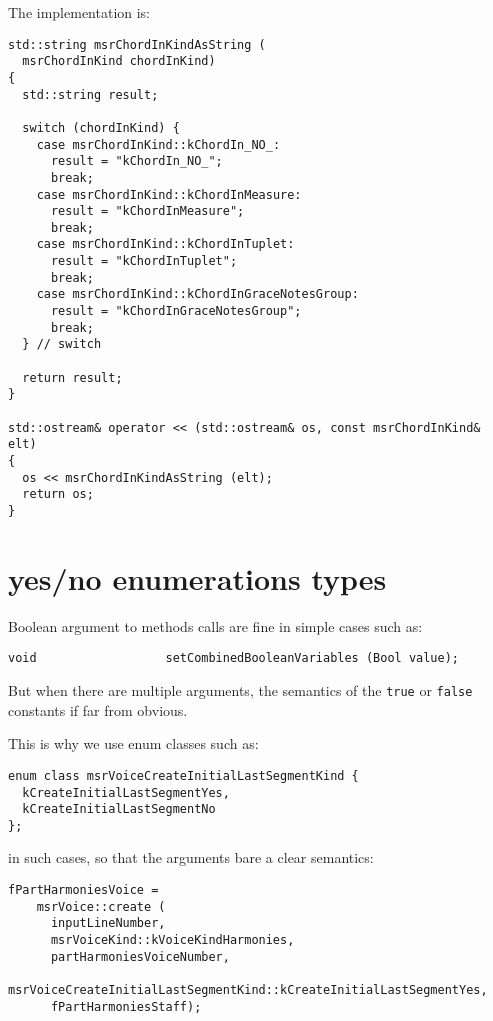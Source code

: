 The implementation is:
\begin{lstlisting}[language=CPlusPlus]
std::string msrChordInKindAsString (
  msrChordInKind chordInKind)
{
  std::string result;

  switch (chordInKind) {
    case msrChordInKind::kChordIn_NO_:
      result = "kChordIn_NO_";
      break;
    case msrChordInKind::kChordInMeasure:
      result = "kChordInMeasure";
      break;
    case msrChordInKind::kChordInTuplet:
      result = "kChordInTuplet";
      break;
    case msrChordInKind::kChordInGraceNotesGroup:
      result = "kChordInGraceNotesGroup";
      break;
  } // switch

  return result;
}

std::ostream& operator << (std::ostream& os, const msrChordInKind& elt)
{
  os << msrChordInKindAsString (elt);
  return os;
}
\end{lstlisting}


\section{yes/no enumerations types}

Boolean argument to methods calls are fine in simple cases such as:
\begin{lstlisting}[language=CPlusPlus]
    void                  setCombinedBooleanVariables (Bool value);
\end{lstlisting}

But when there are multiple arguments, the semantics of the {\tt true} or {\tt false} constants if far from obvious.

This is why we use enum classes such as:
\begin{lstlisting}[language=CPlusPlus]
enum class msrVoiceCreateInitialLastSegmentKind {
  kCreateInitialLastSegmentYes,
  kCreateInitialLastSegmentNo
};
\end{lstlisting}

in such cases, so that the arguments bare a clear semantics:
\begin{lstlisting}[language=CPlusPlus]
  fPartHarmoniesVoice =
    msrVoice::create (
      inputLineNumber,
      msrVoiceKind::kVoiceKindHarmonies,
      partHarmoniesVoiceNumber,
      msrVoiceCreateInitialLastSegmentKind::kCreateInitialLastSegmentYes,
      fPartHarmoniesStaff);
\end{lstlisting}


